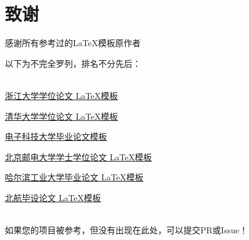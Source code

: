 \chapter*{致谢}
感谢所有参考过的\LaTeX 模板原作者

以下为不完全罗列，排名不分先后：

~~\\

\href{https://www.github.com/TheNetAdmin/zjuthesis}{浙江大学学位论文 \LaTeX 模板}

\href{https://www.github.com/tuna/thuthesis}{清华大学学位论文 \LaTeX 模板}

\href{https://www.github.com/x-magus/ThesisUESTC}{电子科技大学毕业论文模板}

\href{https://www.github.com/sheng-qiang/BUPTBachelorThesis}{北京邮电大学学士学位论文 \LaTeX 模板}

\href{https://www.github.com/dustincys/hithesis}{哈尔滨工业大学毕业论文 \LaTeX 模板}

\href{https://www.github.com/BHOSC/BUAAthesis}{北航毕设论文 \LaTeX 模板}

~~\\

如果您的项目被参考，但没有出现在此处，可以提交PR或Issue！

\cleardoublepage
